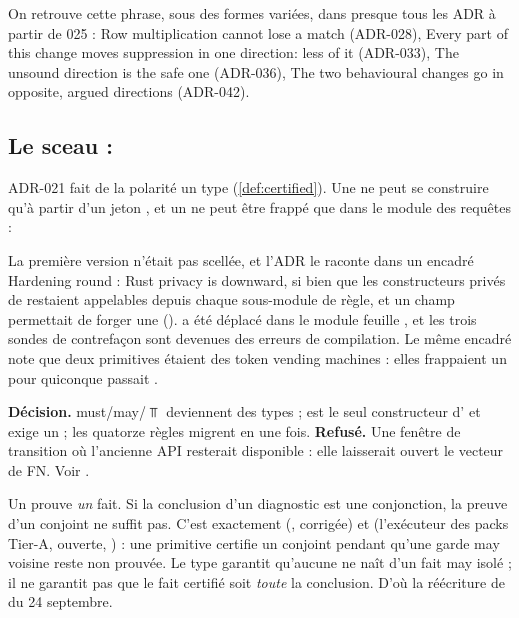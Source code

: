 On retrouve cette phrase, sous des formes variées, dans presque tous les ADR à partir de 025 : \og Row multiplication cannot lose a match\fg{} (ADR-028), \og Every part of this change moves suppression in one direction: less of it\fg{} (ADR-033), \og The unsound direction is the safe one\fg{} (ADR-036), \og The two behavioural changes go in opposite, argued directions\fg{} (ADR-042).

\subsection{Le sceau : \texorpdfstring{}{Certified}}

ADR-021 fait de la polarité un type (\cref{def:certified}). Une \Error{} ne peut se construire qu'à partir d'un jeton , et un  ne peut être frappé que dans le module des requêtes :


La première version n'était pas scellée, et l'ADR le raconte dans un encadré \og Hardening round\fg{} : \og Rust privacy is downward\fg{}, si bien que les constructeurs \og privés\fg{} de  restaient appelables depuis chaque sous-module de règle, et un champ  permettait de forger une \Error{} ().  a été déplacé dans le module feuille , et les trois sondes de contrefaçon sont devenues des erreurs de compilation. Le même encadré note que deux primitives étaient des \og token vending machines\fg{} : elles frappaient un  pour quiconque passait .

\begin{decision}
\textbf{Décision.} must/may/$\Top$ deviennent des types ;  est le seul constructeur d'\Error{} et exige un  ; les quatorze règles migrent en une fois. \textbf{Refusé.} Une fenêtre de transition où l'ancienne API resterait disponible : elle laisserait ouvert le vecteur de FN. Voir .
\end{decision}

\begin{piege}
Un  prouve \emph{un} fait. Si la conclusion d'un diagnostic est une conjonction, la preuve d'un conjoint ne suffit pas. C'est exactement  (, corrigée) et  (l'exécuteur des packs Tier-A, ouverte, ) : une primitive  certifie un conjoint pendant qu'une garde may voisine reste non prouvée. Le type garantit qu'aucune \Error{} ne naît d'un fait may isolé ; il ne garantit pas que le fait certifié soit \emph{toute} la conclusion. D'où la réécriture de  du 24 septembre.
\end{piege}

